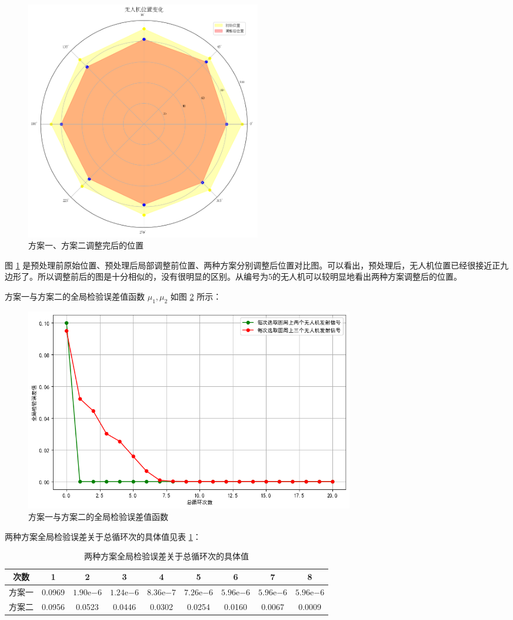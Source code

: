 \documentclass[withoutpreface,bwprint]{cumcmthesis} %
\begin{document}
\begin{figure}[H]
  \centering
  \includegraphics[width=0.5\textwidth]{../figure/q3_3.png} %
  \caption{方案一、方案二调整完后的位置}
  \label{q3_3}
\end{figure}

图 \ref{q3_3} 是预处理前原始位置、预处理后局部调整前位置、两种方案分别调整后位置对比图。可以看出，预处理后，无人机位置已经很接近正九边形了。所以调整前后的图是十分相似的，没有很明显的区别。从编号为5的无人机可以较明显地看出两种方案调整后的位置。

方案一与方案二的全局检验误差值函数 \( \mu_1, \mu_2 \) 如图 \ref{q3_4} 所示：

\begin{figure}[H]
  \centering
  \includegraphics[width=0.7\textwidth]{../figure/q3_4.png} %
  \caption{方案一与方案二的全局检验误差值函数}
  \label{q3_4}
\end{figure}

两种方案全局检验误差关于总循环次的具体值见表 \ref{tab:error_cycle}：

\begin{table}[H]
  \centering
  \caption{两种方案全局检验误差关于总循环次的具体值}
  \label{tab:error_cycle}
  \begin{tabular}{ccccccccc}
    \toprule
    次数 & 1 & 2 & 3 & 4 & 5 & 6 & 7 & 8 \\
    \midrule
    方案一 & 0.0969 & $1.90\mathrm{e}{-6}$ & $1.24\mathrm{e}{-6}$ & $8.36\mathrm{e}{-7}$ & $7.26\mathrm{e}{-6}$ & $5.96\mathrm{e}{-6}$ & $5.96\mathrm{e}{-6}$ & $5.96\mathrm{e}{-6}$ \\
    方案二 & 0.0956 & 0.0523 & 0.0446 & 0.0302 & 0.0254 & 0.0160 & 0.0067 & 0.0009 \\
    \bottomrule
  \end{tabular}
\end{table}
\end{document}
